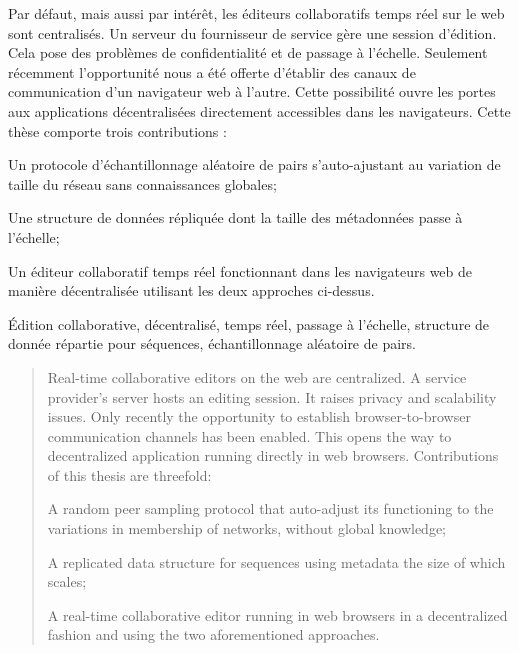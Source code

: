 
\begin{resume}
  Par défaut, mais aussi par intérêt, les éditeurs collaboratifs temps réel sur
  le web sont centralisés. Un serveur du fournisseur de service gère une session
  d'édition. Cela pose des problèmes de confidentialité et de passage à
  l'échelle.  Seulement récemment l'opportunité nous a été offerte d'établir des
  canaux de communication d'un navigateur web à l'autre. Cette possibilité ouvre
  les portes aux applications décentralisées directement accessibles dans les
  navigateurs. Cette thèse comporte trois contributions :
  \begin{inparaenum}[(i)]
  \item Un protocole d'échantillonnage aléatoire de pairs s'auto-ajustant au
    variation de taille du réseau sans connaissances globales;
  \item Une structure de données répliquée dont la taille des métadonnées passe
    à l'échelle;
  \item Un éditeur collaboratif temps réel fonctionnant dans les navigateurs web
    de manière décentralisée utilisant les deux approches ci-dessus.
  \end{inparaenum}
\end{resume}

\begin{motscles}
  Édition collaborative, décentralisé, temps réel, passage à l'échelle,
  structure de donnée répartie pour séquences, échantillonnage aléatoire de
  pairs.
\end{motscles}

\begin{abstract}
  Real-time collaborative editors on the web are centralized. A service
  provider's server hosts an editing session. It raises privacy and scalability
  issues. Only recently the opportunity to establish browser-to-browser
  communication channels has been enabled. This opens the way to decentralized
  application running directly in web browsers. Contributions of this thesis are
  threefold: 
  \begin{inparaenum}[(i)]
  \item A random peer sampling protocol that auto-adjust its functioning to
    the variations in membership of networks, without global knowledge;
  \item A replicated data structure for sequences using metadata the size of
    which scales;
  \item A real-time collaborative editor running in web browsers in a
    decentralized fashion and using the two aforementioned approaches.
  \end{inparaenum}
\end{abstract}

